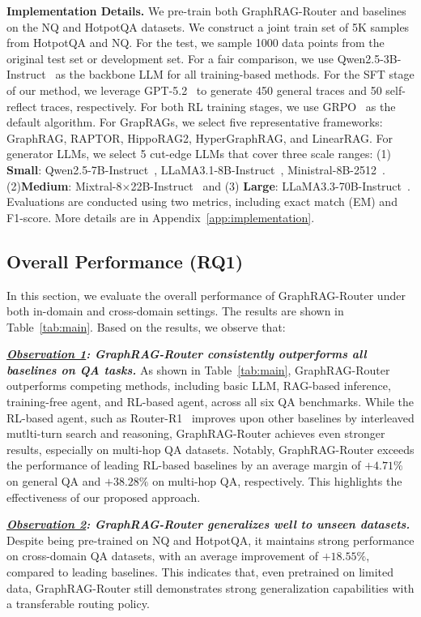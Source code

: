 \noindent\textbf{Implementation Details.}
We pre-train both GraphRAG-Router and baselines on the NQ and HotpotQA datasets. We construct a joint train set of 5K samples from HotpotQA and NQ. For the test, we sample 1000 data points from the original test set or development set. For a fair comparison, we use Qwen2.5-3B-Instruct~\cite{Qwen2.5} as the backbone LLM for all training-based methods. For the SFT stage of our method, we leverage GPT-5.2~\cite{GPT5} to generate 450 general traces and 50 self-reflect traces, respectively. For both RL training stages, we use GRPO~\cite{GRPO} as the default algorithm. For GrapRAGs, we select five representative frameworks: GraphRAG, RAPTOR, HippoRAG2, HyperGraphRAG, and LinearRAG. For generator LLMs, we select 5 cut-edge LLMs that cover three scale ranges: (1) \textbf{Small}: Qwen2.5-7B-Instruct~\cite{Qwen2.5}, LLaMA3.1-8B-Instruct~\cite{llama3}, Ministral-8B-2512~\cite{ministral3}. (2)\textbf{Medium}: Mixtral-8$\times$22B-Instruct~\cite{mixtralexperts} and (3) \textbf{Large}: LLaMA3.3-70B-Instruct~\cite{llama3}. Evaluations are conducted using two metrics, including exact match (EM) and F1-score. More details are in Appendix~\ref{app:implementation}.


\subsection{Overall Performance (RQ1)}
In this section, we evaluate the overall performance of GraphRAG-Router under both in-domain and cross-domain settings. The results are shown in Table~\ref{tab:main}. Based on the results, we observe that:

\textit{\textbf{\underline{Observation 1}: GraphRAG-Router consistently outperforms all baselines on QA tasks.}} As shown in Table~\ref{tab:main}, GraphRAG-Router outperforms competing methods, including basic LLM, RAG-based inference, training-free agent, and RL-based agent, across all six QA benchmarks. While the RL-based agent, such as Router-R1~\cite{Router-R1} improves upon other baselines by interleaved mutlti-turn search and reasoning, GraphRAG-Router achieves even stronger results, especially on multi-hop QA datasets. Notably, GraphRAG-Router exceeds the performance of leading RL-based baselines by an average margin of $+4.71\%$ on general QA and $+38.28\%$ on multi-hop QA, respectively. This highlights the effectiveness of our proposed approach.

\textit{\textbf{\underline{Observation 2}: GraphRAG-Router generalizes well to unseen datasets.}} Despite being pre-trained on NQ and HotpotQA, it maintains strong performance on cross-domain QA datasets, with an average improvement of $+18.55\%$, compared to leading baselines. This indicates that, even pretrained on limited data,  GraphRAG-Router still demonstrates strong generalization capabilities with a transferable routing policy.
